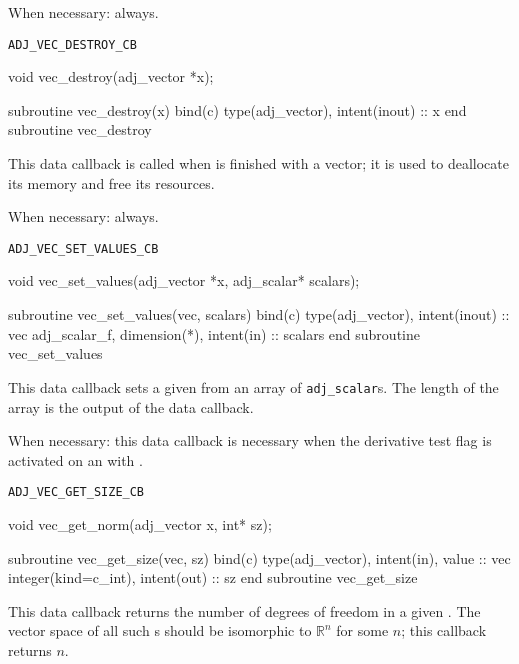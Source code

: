When necessary: always.
\begin{boxwithtitle}{\texttt{ADJ_VEC_DESTROY_CB}}
\begin{minipage}{\columnwidth}
\begin{ccode}
  void vec_destroy(adj_vector *x);
\end{ccode}
\begin{fortrancode}
  subroutine vec_destroy(x) bind(c)
    type(adj_vector), intent(inout) :: x
  end subroutine vec_destroy
\end{fortrancode}
\end{minipage}
\end{boxwithtitle}
This data callback is called when \libadjoint is finished
with a vector; it is used to deallocate its memory and free
its resources.

When necessary: always.
\begin{boxwithtitle}{\texttt{ADJ_VEC_SET_VALUES_CB}}
\begin{minipage}{\columnwidth}
\begin{ccode}
  void vec_set_values(adj_vector *x, adj_scalar* scalars);
\end{ccode}
\begin{fortrancode}
  subroutine vec_set_values(vec, scalars) bind(c)
    type(adj_vector), intent(inout) :: vec
    adj_scalar_f, dimension(*), intent(in) :: scalars
  end subroutine vec_set_values
\end{fortrancode}
\end{minipage}
\end{boxwithtitle}
This data callback sets a given  from an array
of \texttt{adj_scalar}s. The length of the array is the output of
the  data callback.

When necessary: this data callback is necessary when the derivative test flag
is activated on an  with .
\begin{boxwithtitle}{\texttt{ADJ_VEC_GET_SIZE_CB}}
\begin{minipage}{\columnwidth}
\begin{ccode}
  void vec_get_norm(adj_vector x, int* sz);
\end{ccode}
\begin{fortrancode}
  subroutine vec_get_size(vec, sz) bind(c)
    type(adj_vector), intent(in), value :: vec
    integer(kind=c_int), intent(out) :: sz
  end subroutine vec_get_size
\end{fortrancode}
\end{minipage}
\end{boxwithtitle}
This data callback returns the number of degrees of freedom in a given . The
vector space of all such s should be isomorphic to $\mathbb{R}^n$ for some $n$;
this callback returns $n$.

